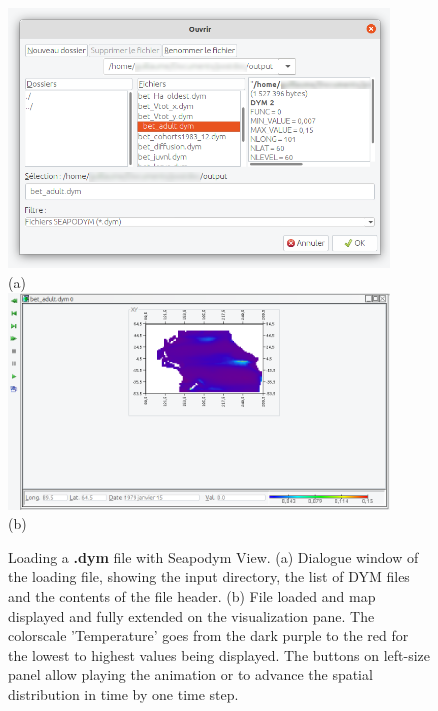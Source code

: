 \begin{figure}
\begin{center}
\vbox{
\includegraphics[width=0.9\textwidth,trim=0mm 0mm 0mm 0mm,clip]{annexes/figs/loading_file.png}\\
\vspace{1mm}
(a)\\
}
\vspace{1mm}
\vbox{
\includegraphics[width=0.9\textwidth,trim=0mm 0mm 0mm 0mm,clip]{annexes/figs/map_loaded.png}\\
\vspace{1mm}
(b) \\
}
\vspace{1mm}
\caption{ Loading a {\bfseries {\ttfamily .dym}} file with Seapodym View. (a) Dialogue window  of the loading file, showing the input directory, the list of DYM files and the contents of the file header. (b) File loaded and map displayed and fully extended on the visualization pane. The colorscale 'Temperature' goes from the dark purple to the red for the lowest to highest values being displayed. The buttons on left-size panel allow playing the animation or to advance the spatial distribution in time by one time step. 
}
\label{fig:coloredmap}
\vspace{-0.0cm}
\end{center}
\end{figure}

